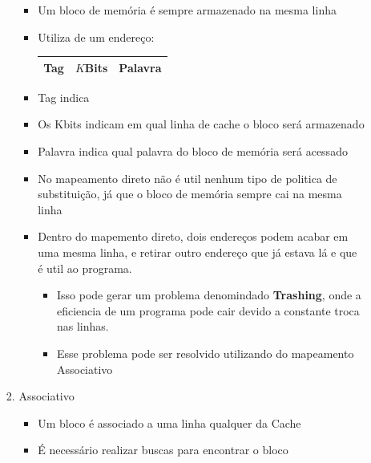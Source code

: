 \documentclass[12pt]{article}
\begin{document}
\begin{itemize}
\begin{itemize}
\begin{enumerate}
\begin{itemize}
                \item Um bloco de memória é sempre armazenado na mesma linha
                \item Utiliza de um endereço:
                \begin{table}[H]
                    \centering
                    \begin{tabular}{|l|c|r|}
                        \hline
                        Tag & $K$Bits & Palavra \\ \hline
                    \end{tabular}
                \end{table}
                \item Tag indica 
                \item Os Kbits indicam em qual linha de cache o bloco será 
                armazenado
                \item Palavra indica qual palavra do bloco de memória será 
                acessado
                \item No mapeamento direto não é util nenhum tipo de politica 
                de substituição, já que o bloco de memória sempre cai na mesma 
                linha
                \item Dentro do mapemento direto, dois endereços podem acabar 
                em uma mesma linha, e retirar outro endereço que já estava lá e 
                que é util ao programa.
                \begin{itemize}
                    \item Isso pode gerar um problema denomindado \textbf{Trashing}, 
                    onde a eficiencia de um programa pode cair devido a constante 
                    troca nas linhas.
                    \item Esse problema pode ser resolvido utilizando do 
                    mapeamento Associativo
                \end{itemize}
            \end{itemize}
            \item Associativo
            \begin{itemize}
                \item Um bloco é associado a uma linha qualquer da Cache
                \item É necessário realizar buscas para encontrar o bloco
                \begin{table}[H]
                    \centering
                    \begin{tabular}{|l|r|}

\end{tabular}
\end{table}
\end{itemize}
\end{enumerate}
\end{itemize}
\end{itemize}
\end{document}
